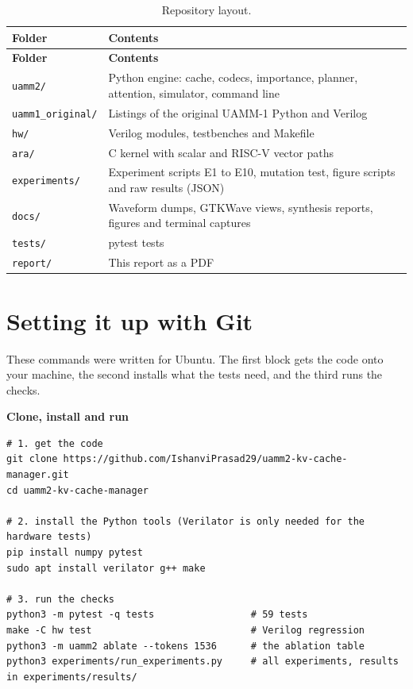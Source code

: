 \documentclass[12pt,a4paper]{report}
\begin{document}
{\fontsize{9}{10.5}\selectfont\setlength{\tabcolsep}{3pt}
\begin{longtable}{>{\raggedright\arraybackslash}p{1.40in}>{\raggedright\arraybackslash}p{4.66in}}
\caption{Repository layout.}\\
\toprule
\textbf{Folder} & \textbf{Contents} \\\midrule\endfirsthead
\toprule \textbf{Folder} & \textbf{Contents} \\\midrule\endhead
\bottomrule\endfoot
\texttt{uamm2/\allowbreak{}} & Python engine: cache, codecs, importance, planner, attention, simulator, command line \\
\texttt{uamm1\_\allowbreak{}\allowbreak{}original/\allowbreak{}} & Listings of the original UAMM-1 Python and Verilog \\
\texttt{hw/\allowbreak{}} & Verilog modules, testbenches and Makefile \\
\texttt{ara/\allowbreak{}} & C kernel with scalar and RISC-V vector paths \\
\texttt{experiments/\allowbreak{}} & Experiment scripts E1 to E10, mutation test, figure scripts and raw results (JSON) \\
\texttt{docs/\allowbreak{}} & Waveform dumps, GTKWave views, synthesis reports, figures and terminal captures \\
\texttt{tests/\allowbreak{}} & 59 pytest tests \\
\texttt{report/\allowbreak{}} & This report as a PDF \\
\bottomrule
\end{longtable}}
\section{Setting it up with Git}
These commands were written for Ubuntu. The first block gets the code onto your machine, the second installs what the tests need, and the third runs the checks.

\par\smallskip\noindent\textbf{Clone, install and run}\par\nopagebreak
\begin{lstlisting}
# 1. get the code
git clone https://github.com/IshanviPrasad29/uamm2-kv-cache-manager.git
cd uamm2-kv-cache-manager

# 2. install the Python tools (Verilator is only needed for the hardware tests)
pip install numpy pytest
sudo apt install verilator g++ make

# 3. run the checks
python3 -m pytest -q tests                 # 59 tests
make -C hw test                            # Verilog regression
python3 -m uamm2 ablate --tokens 1536      # the ablation table
python3 experiments/run_experiments.py     # all experiments, results in experiments/results/
\end{lstlisting}
\end{document}
